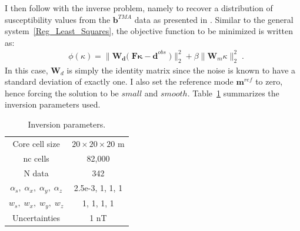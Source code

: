 I then follow with the inverse problem, namely to recover a distribution of susceptibility values from the $\mathbf{b}^{TMA}$ data as presented in \cite{LiOldenburg1996}. 
Similar to the general system~\ref{Reg_Least_Squares}, the objective function to be minimized is written as:
 \begin{equation} \label{eq:phi_3D}
\begin{aligned}
&\phi(\kappa) =  \|\mathbf{W_\text{d} (\;F\kappa - d}^{obs}\;)\|_2^2 + \beta \| \mathbf{W}_m \kappa \|^2_2\;.
\end{aligned}
\end{equation}
In this case, $\mathbf{W}_d$ is simply the identity matrix since the noise is known to have a standard deviation of exactly one.
I also set the reference mode $\mathbf{m}^{ref}$ to zero, hence forcing the solution to be $small$ and $smooth$.
Table~\ref{tbl:Induced_inv} summarizes the inversion parameters used.

\begin{table}
\centering
\caption{Inversion parameters.}
\label{tbl:Induced_inv}
\renewcommand{\arraystretch}{1.2}
\begin{tabular}{|c|c|}
Core cell size & $20\times20\times20$ m \\
nc cells & 82,000\\
N data& 342 \\
$\alpha_s,\; \alpha_x,\; \alpha_y, \; \alpha_z$ & 2.5e-3, 1, 1, 1 \\
$w_s,\; w_x,\; w_y, \; w_z$ & 1, 1, 1, 1 \\
Uncertainties & 1 nT
\end{tabular}
\end{table}

